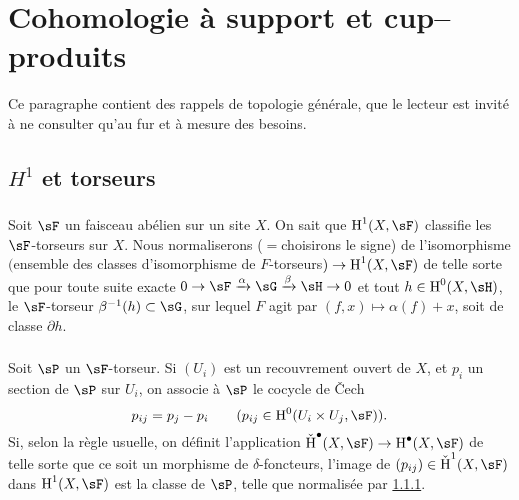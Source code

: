 \section{Cohomologie à support et cup--produits}\label{IV:1}

Ce paragraphe contient des rappels de topologie générale, que le 
lecteur est invité à ne consulter qu'au fur et à mesure des besoins.










\subsection{\texorpdfstring{$H^1$}{H1} et torseurs}\label{IV:1-1}





\subsubsection{}\label{IV:1-1-1}

Soit $\sF$ un faisceau abélien sur un site $X$. On sait que $\h^1(X,\sF)$ 
classifie les $\sF$-torseurs sur $X$. Nous normaliserons ($=$choisirons le 
signe) de l'isomorphisme $($ensemble des classes d'isomorphisme de 
$F$-torseurs$)\to \h^1(X,\sF)$ de telle sorte que pour toute suite exacte 
$0\to \sF\xrightarrow\alpha\sG\xrightarrow\beta\sH\to 0$ et tout 
$h\in\h^0(X,\sH)$, le $\sF$-torseur $\beta^{-1}(h)\subset \sG$, sur lequel 
$F$ agit par $(f,x)\mapsto \alpha(f)+x$, soit de classe $\partial h$. 





\subsubsection{}\label{IV:1-1-2}

Soit $\sP$ un $\sF$-torseur. Si $(U_i)$ est un recouvrement ouvert de $X$, et 
$p_i$ un section de $\sP$ sur $U_i$, on associe à $\sP$ le cocycle de 
\v{C}ech
\[
  p_{i j} = p_j - p_i \qquad \text{($p_{i j}\in \h^0(U_i\times U_j,\sF)$).}
\]
Si, selon la règle usuelle, on définit l'application 
$\operatorname{\check H}^\bullet(X,\sF)\to \h^\bullet(X,\sF)$ de telle sorte 
que ce soit un morphisme de $\delta$-foncteurs, l'image de 
$(p_{i j})\in \operatorname{\check H}^1(X,\sF)$ dans $\h^1(X,\sF)$ est la 
classe de $\sP$, telle que normalisée par \ref{IV:1-1-1}. 





